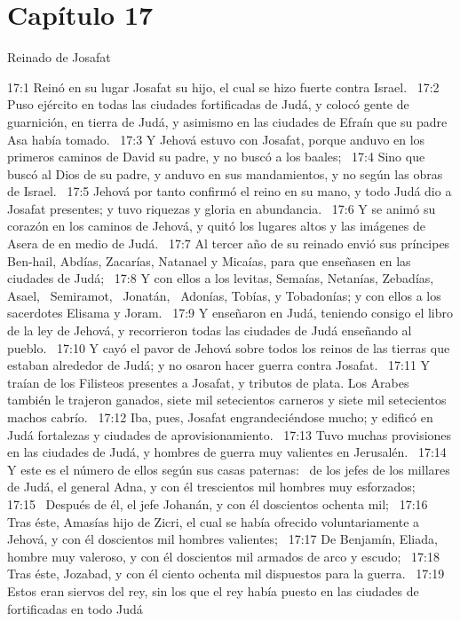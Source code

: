 																\section*{Capítulo 17 }
																	Reinado de Josafat  
																	
																	17:1 Reinó en su lugar Josafat su hijo, el cual se hizo fuerte contra Israel.  
																	17:2 Puso ejército en todas las ciudades fortificadas de Judá, y colocó gente de guarnición, en tierra de Judá, y asimismo en las ciudades de Efraín que su padre Asa había tomado.  
																	17:3 Y Jehová estuvo con Josafat, porque anduvo en los primeros caminos de David su padre, y no buscó a los baales;  
																	17:4 Sino que buscó al Dios de su padre, y anduvo en sus mandamientos, y no según las obras de Israel.  
																	17:5 Jehová por tanto confirmó el reino en su mano, y todo Judá dio a Josafat presentes; y tuvo riquezas y gloria en abundancia.  
																	17:6 Y se animó su corazón en los caminos de Jehová, y quitó los lugares altos y las imágenes de Asera de en medio de Judá.  
																	17:7 Al tercer año de su reinado envió sus príncipes Ben-hail, Abdías, Zacarías, Natanael y Micaías, para que enseñasen en las ciudades de Judá;  
																	17:8 Y con ellos a los levitas, Semaías, Netanías, Zebadías,  Asael,  Semiramot,  Jonatán,  Adonías, Tobías, y Tobadonías; y con ellos a los sacerdotes Elisama y Joram.  
																	17:9 Y enseñaron en Judá, teniendo consigo el libro de la ley de Jehová, y recorrieron todas las ciudades de Judá enseñando al pueblo.  
																	17:10 Y cayó el pavor de Jehová sobre todos los reinos de las tierras que estaban alrededor de Judá; y no osaron hacer guerra contra Josafat.  
																	17:11 Y traían de los Filisteos presentes a Josafat, y tributos de plata. Los Arabes también le trajeron ganados, siete mil setecientos carneros y siete mil setecientos machos cabrío.  
																	17:12 Iba, pues, Josafat engrandeciéndose mucho; y edificó en Judá fortalezas y ciudades de aprovisionamiento.  
																	17:13 Tuvo muchas provisiones en las ciudades de Judá, y hombres de guerra muy valientes en Jerusalén.  
																	17:14 Y este es el número de ellos según sus casas paternas:  de los jefes de los millares de Judá, el general Adna, y con él trescientos mil hombres muy esforzados;  
																	17:15  Después de él, el jefe Johanán, y con él doscientos ochenta mil;  
																	17:16 Tras éste, Amasías hijo de Zicri, el cual se había ofrecido voluntariamente a Jehová, y con él doscientos mil hombres valientes;  
																	17:17 De Benjamín, Eliada, hombre muy valeroso, y con él doscientos mil armados de arco y escudo;  
																	17:18 Tras éste, Jozabad, y con él ciento ochenta mil dispuestos para la guerra.  
																	17:19 Estos eran siervos del rey, sin los que el rey había puesto en las ciudades de fortificadas en todo Judá  
